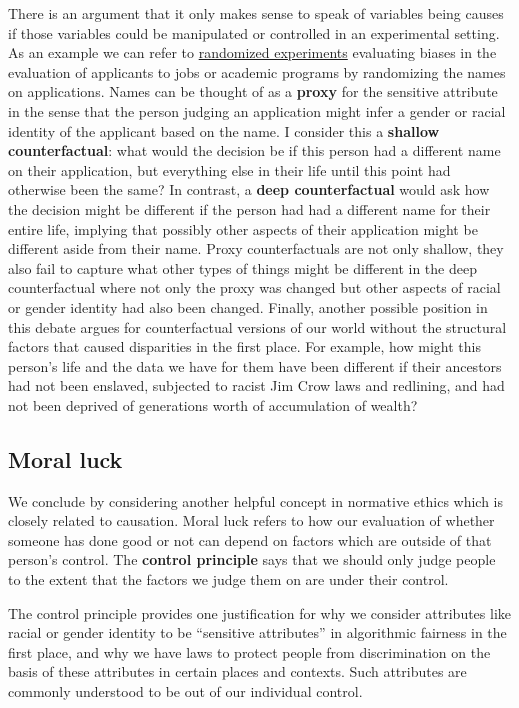 \documentclass[]{book}
\theoremstyle{definition}
\theoremstyle{definition}
\theoremstyle{definition}
\theoremstyle{remark}
\begin{document}
There is an argument that it only makes sense to speak of variables
being causes if those variables could be manipulated or controlled in an
experimental setting. As an example we can refer to
\href{https://www.pnas.org/content/109/41/16474.short}{randomized
experiments} evaluating biases in the evaluation of applicants to jobs
or academic programs by randomizing the names on applications. Names can
be thought of as a \textbf{proxy} for the sensitive attribute in the
sense that the person judging an application might infer a gender or
racial identity of the applicant based on the name. I consider this a
\textbf{shallow counterfactual}: what would the decision be if this
person had a different name on their application, but everything else in
their life until this point had otherwise been the same? In contrast, a
\textbf{deep counterfactual} would ask how the decision might be
different if the person had had a different name for their entire life,
implying that possibly other aspects of their application might be
different aside from their name. Proxy counterfactuals are not only
shallow, they also fail to capture what other types of things might be
different in the deep counterfactual where not only the proxy was
changed but other aspects of racial or gender identity had also been
changed. Finally, another possible position in this debate argues for
counterfactual versions of our world without the structural factors that
caused disparities in the first place. For example, how might this
person's life and the data we have for them have been different if their
ancestors had not been enslaved, subjected to racist Jim Crow laws and
redlining, and had not been deprived of generations worth of
accumulation of wealth?

\subsection{Moral luck}\label{moral-luck}

We conclude by considering another helpful concept in normative ethics
which is closely related to causation. Moral luck refers to how our
evaluation of whether someone has done good or not can depend on factors
which are outside of that person's control. The \textbf{control
principle} says that we should only judge people to the extent that the
factors we judge them on are under their control.

The control principle provides one justification for why we consider
attributes like racial or gender identity to be ``sensitive attributes''
in algorithmic fairness in the first place, and why we have laws to
protect people from discrimination on the basis of these attributes in
certain places and contexts. Such attributes are commonly understood to
be out of our individual control.
\end{document}
